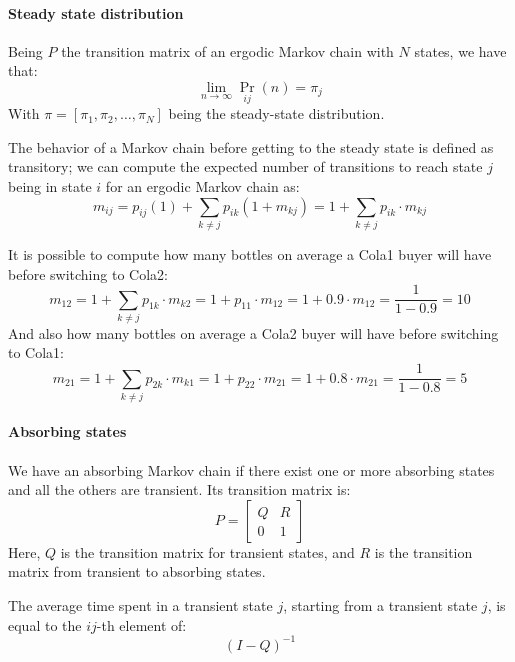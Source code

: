 \paragraph*{Steady state distribution}
Being $P$ the transition matrix of an ergodic Markov chain with $N$ states, we have that:
\[\lim_{n \rightarrow \infty}\Pr_{ij}(n)=\pi_j\]
With $\pi=\left[ \pi_1,\pi_2,\dots,\pi_N \right]$ being the steady-state distribution.

The behavior of a Markov chain before getting to the steady state is defined as transitory; we can compute the expected number of transitions to reach state $j$ being in state $i$ for an ergodic Markov chain as:
\[m_{ij}=p_{ij}(1)+\sum_{k \neq j}p_{ik}(1+m_{kj})=1+\sum_{k \neq j}p_{ik}\cdot m_{kj}\]
\begin{example}
    It is possible to compute how many bottles on average a Cola1 buyer will have before switching to Cola2:
    \[m_{12}=1+\sum_{k \neq j}p_{1k}\cdot m_{k2}=1+p_{11}\cdot m_{12}=1+0.9\cdot m_{12}=\dfrac{1}{1-0.9}=10\]
    And also how many bottles on average a Cola2 buyer will have before switching to Cola1:
    \[m_{21}=1+\sum_{k \neq j}p_{2k}\cdot m_{k1}=1+p_{22}\cdot m_{21}=1+0.8\cdot m_{21}=\dfrac{1}{1-0.8}=5\]
\end{example}

\paragraph*{Absorbing states}
We have an absorbing Markov chain if there exist one or more absorbing states and all the others are transient.
Its transition matrix is:
\[P=
\begin{bmatrix}
    Q & R \\
    0 & 1
\end{bmatrix}\]
Here, $Q$ is the transition matrix for transient states, and $R$ is the transition matrix from transient to absorbing states.

The average time spent in a transient state $j$, starting from a transient state $j$, is equal to the $ij$-th element of:
\[(I-Q)^{-1}\]

